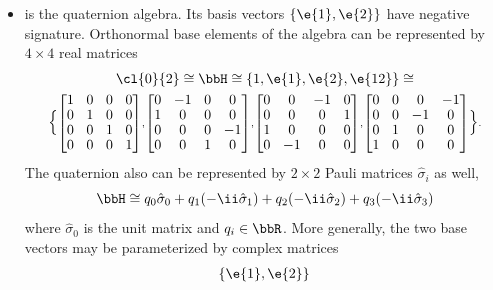 \begin{unit}
\begin{itemize}
\begin{align*}
&\cong\left\{
\begin{bmatrix}\cosh\varphi&\sinh\varphi\\ -\sinh\varphi& -\cosh\varphi\end{bmatrix},
\begin{bmatrix}-\sinh\varphi&-\cosh\varphi\\ \cosh\varphi& \sinh\varphi\end{bmatrix}
\right\}.
\end{align*}

\item[\cl{0}{2}] is the quaternion algebra. Its basis vectors
$\{\e{1},\e{2}\}$ have negative signature. Orthonormal base
elements of the algebra can be represented by $4\times 4$ real
matrices
  \[
\begin{gathered}
\cl{0}{2}\cong\bbH\cong\{1,\e{1},\e{2},\e{12}\}\cong\\
\Big\{
\renewcommand*{\arraystretch}{0.9}
\arraycolsep=0.9\arraycolsep
\scriptstyle
\begin{bmatrix}1&0&0&0\\0&1&0&0\\0&0&1&0\\0&0&0&1\end{bmatrix},
\begin{bmatrix}0&-1&0&0\\1&0&0&0\\0&0&0&-1\\0&0&1&0\end{bmatrix},
\begin{bmatrix}0&0&-1&0\\0&0&0&1\\1&0&0&0\\0&-1&0&0
\end{bmatrix},\begin{bmatrix}0&0&0&-1\\0&0&-1&0\\0&1&0&0\\1&0&0&0\end{bmatrix}
\Big\}.
\end{gathered}
\]
The quaternion also can be represented by $2\times 2$ Pauli matrices
$\hat{\sigma}_{i}$ as well,
\[\bbH\cong
q_0\hat{\sigma}_{0}+q_1(-\ii\hat{\sigma}_{1})+q_2(-\ii\hat{\sigma}_{2})+q_3(-\ii\hat{\sigma}_{3})\]
where $\hat{\sigma}_{0}$ is the unit matrix and $q_i\in\bbR$. More
generally, the two base vectors may be parameterized  by complex
matrices
\begin{align*}
\{\e{1},\e{2}\}

\end{align*}
\end{itemize}
\end{unit}
